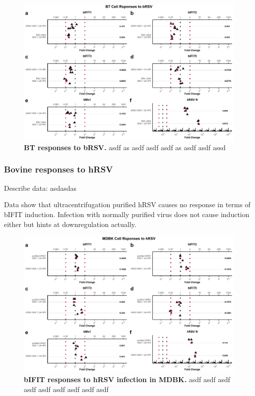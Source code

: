 \begin{figure}
    \centering
    \includegraphics[width=1\linewidth]{07. Chapter 2/Figs/02. Induction/09. bt_brsv.pdf}
    \caption[BT responses to bRSV.]{\textbf{BT responses to bRSV.} asdf as asdf asdf asdf as asdf asdf assd }
    \label{BT responses to bRSV}
\end{figure}

\subsubsection{Bovine responses to hRSV} \label{MDKB responses to hRSV}
Describe data: \newline
asdasdas

Data show that ultracentrifugation purified hRSV causes no response in terms of bIFIT induction. Infection with normally purified virus does not cause induction either but hints at downregulation actually.

\begin{figure}
    \centering
    \includegraphics[width=1\linewidth]{07. Chapter 2/Figs/02. Induction/07. mdbk_hrsv.pdf}
    \caption[bIFIT responses to hRSV infection in MDBK.]{\textbf{bIFIT responses to hRSV infection in MDBK.} asdf asdf asdf asdf asdf asdf asdf asdf asdf }
    \label{bIFIT responses to hRSV infection in MDBK}
\end{figure}


